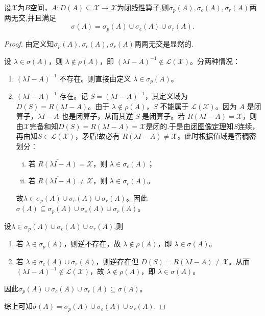 \documentclass[../../main.tex]{subfiles}%
\begin{document}
\begin{proposition}
设$\mathscr{X}$为$B$空间，$A:D(A)\subseteq\mathscr{X}\to\mathscr{X}$为闭线性算子,则$\sigma_p(A),\sigma_c(A),\sigma_r(A)$两两无交,并且满足
$$\sigma(A)=\sigma_p(A)\cup\sigma_c(A)\cup\sigma_r(A).$$
\end{proposition}
\begin{proof}

由定义知$\sigma_p(A),\sigma_c(A),\sigma_r(A)$两两无交是显然的.

设 $\lambda \in \sigma(A)$，则 $\lambda \notin \rho(A)$，即 $(\lambda I - A)^{-1} \notin \mathscr{L}(\mathscr{X})$。分两种情况：
\begin{enumerate}[(1)]
\item $(\lambda I - A)^{-1}$ 不存在。则直接由定义 $\lambda \in \sigma_p(A)$。

\item $(\lambda I - A)^{-1}$ 存在。记 $S = (\lambda I - A)^{-1}$，其定义域为 $D(S) = R(\lambda I - A)$。由于 $\lambda \notin \rho(A)$，$S$ 不能属于 $\mathscr{L}(\mathscr{X})$。因为 $A$ 是闭算子，$\lambda I - A$ 也是闭算子，从而其逆 $S$ 是闭算子。若 $R(\lambda I - A) = \mathscr{X}$，则由$\mathscr{X}$完备和知$D(S)=R(\lambda I-A)=\mathscr{X}$是闭的.于是由\hyperref[theorem:泛函分析--闭图像定理]{闭图像定理}知$S$连续，再由知$S \in \mathscr{L}(\mathscr{X})$，矛盾!故必有 $R(\lambda I - A) \neq \mathscr{X}$。此时根据值域是否稠密划分：
\begin{enumerate}[(i)]
\item 若 $\overline{R(\lambda I - A)} = \mathscr{X}$，则 $\lambda \in \sigma_c(A)$；

\item 若 $\overline{R(\lambda I - A)} \neq \mathscr{X}$，则 $\lambda \in \sigma_r(A)$。
\end{enumerate}
故$\lambda \in \sigma_p(A) \cup \sigma_c(A) \cup \sigma_r(A)$。因此 $\sigma(A) \subseteq \sigma_p(A) \cup \sigma_c(A) \cup \sigma_r(A)$。
\end{enumerate}

设$\lambda \in \sigma_p(A) \cup \sigma_c(A) \cup \sigma_r(A)$,则
\begin{enumerate}[(1)]
\item 若 $\lambda \in \sigma_p(A)$，则逆不存在，故 $\lambda \notin \rho(A)$，即 $\lambda \in \sigma(A)$。

\item 若 $\lambda \in \sigma_c(A) \cup \sigma_r(A)$，则逆存在但 $D(S)=R(\lambda I - A) \neq \mathscr{X}$。从而 $(\lambda I - A)^{-1} \notin \mathscr{L}(\mathscr{X})$，故 $\lambda \notin \rho(A)$，即 $\lambda \in \sigma(A)$。
\end{enumerate}
因此$\sigma_p(A) \cup \sigma_c(A) \cup \sigma_r(A) \subseteq \sigma(A)$。

综上可知$\sigma(A) = \sigma_p(A) \cup \sigma_c(A) \cup \sigma_r(A)$.

\end{proof}
\end{document}
